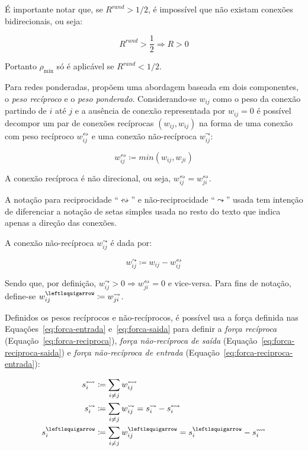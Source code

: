 \documentclass[12pt,a4paper]{article}
\theoremstyle{hypo}
\newcommand{\defn}{\coloneqq} %
\newcommand{\recin}[1]{#1^\leftlsquigarrow} %
\newcommand{\recout}[1]{#1^\leadsto} %
\newcommand{\recboth}[1]{#1^\leftrightsquigarrow} %
\begin{document}
É importante notar que, se $R^\textit{rand} > 1/2$, é impossível que não existam conexões bidirecionais, ou seja:

\begin{equation}
R^\textit{rand} > \frac{1}{2} \Rightarrow R > 0
\end{equation}

Portanto $\rho_\text{min}$ só é aplicável se $R^\textit{rand} < 1 / 2$.

Para redes ponderadas,  propõem uma abordagem baseada em dois componentes, o \textit{peso recíproco} e o \textit{peso ponderado}. Considerando-se $w_{ij}$ como o peso da conexão partindo de $i$ até $j$ e a ausência de conexão representada por $w_{ij} = 0$ é possível decompor um par de conexões recíprocas $(w_{ij}, w_{ij})$ na forma de uma conexão com peso recíproco $w^\leftrightsquigarrow_{ij}$ e uma conexão não-recíproca $w^\leadsto_{ij}$:

\begin{equation}
\recboth{w}_{ij} \defn min(w_{ij},w_{ji})
\end{equation}

A conexão recíproca é não direcional, ou seja, $\recboth{w}_{ij} = \recboth{w}_{ji}$.

A notação para reciprocidade \enquote{$\leftrightsquigarrow$} e não-reciprocidade \enquote{$\leadsto$} usada tem intenção de diferenciar a notação de setas simples usada no resto do texto que indica apenas a direção das conexões.

A conexão não-recíproca $\recout{w}_{ij}$ é dada por:
 
\begin{equation}
\recout{w}_{ij} \defn w_{ij} - \recboth{w}_{ij}
\end{equation}

Sendo que, por definição, $\recout{w}_{ij} > 0 \Rightarrow \recboth{w}_{ji} = 0$ e vice-versa. Para fins de notação, define-se $\recin{w}_{ij} \defn \recout{w}_{ji}$.

Definidos os pesos recíprocos e não-recíprocos, é possível usa a força definida nas Equações~\ref{eq:forca-entrada} e~\ref{eq:forca-saida} para definir a \textit{força recíproca} (Equação~\ref{eq:forca-reciproca}), \textit{força não-recíproca de saída}  (Equação~\ref{eq:forca-reciproca-saida}) e \textit{força não-recíproca de entrada}  (Equação~\ref{eq:forca-reciproca-entrada}):

\begin{align}
\recboth{s}_i &\defn \sum_{i \neq j} \recboth{w}_{ij} \label{eq:forca-reciproca} \\
\recout{s}_i  &\defn \sum_{i \neq j} \recout{w}_{ij} = \recout{s}_i - \recboth{s}_i \label{eq:forca-reciproca-saida} \\
\recin{s}_i   &\defn \sum_{i \neq j} \recin{w}_{ij} = \recin{s}_i - \recboth{s}_i \label{eq:forca-reciproca-entrada}
\end{align}
\end{document}
